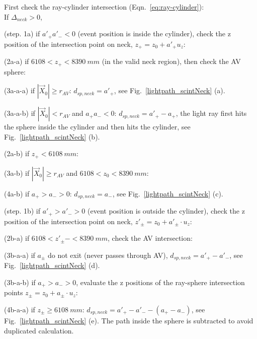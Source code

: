 \begin{algorithm}
	
	First check the ray-cylinder intersection (Eqn.~\ref{eq:ray-cylinder}):\\
	If {$\Delta_{neck}>0$}, 
	
	\hspace{2mm}(step. 1a) if $a'_+a'_-<0$ (event position is inside the cylinder), check the z position of the intersection point on neck, $z_+ = z_0 + a'_+u_z$: 
	
	\hspace{6mm}(2a-a) if $6108<z_+<8390~mm$ (in the valid neck region), then check the AV sphere:
	
	\hspace{8mm}(3a-a-a) if $|\vec{X}_0|\geq r_{AV}$: $d_{sp,neck}=a'_+$, see Fig.~\ref{lightpath_scintNeck} (a).
	
	\hspace{8mm}(3a-a-b) if $|\vec{X}_0|<r_{AV}$ and $a_+a_-<0$: $d_{sp,neck}=a'_+-a_+$, the light ray first hits the sphere inside the cylinder and then hits the cylinder, see Fig.~\ref{lightpath_scintNeck} (b). 
	
	\hspace{6mm}(2a-b) if $z_+<6108~mm$:
	
	\hspace{8mm}(3a-b) if $|\vec X_0|\geq r_{AV}$ and $6108<z_0<8390~mm$:
	
	\hspace{10mm}(4a-b) if $a_+>a_->0$: $d_{sp,neck}=a_-$, see Fig.~\ref{lightpath_scintNeck} (c).
	
	\hspace{2mm}(step. 1b) if $a'_+>a'_->0$ (event position is outside the cylinder), check the z position of the intersection point on neck, $z'_{\pm}=z_0+a'_\pm\cdot u_z$:
	
	\hspace{6mm}(2b-a) if $6108<z'_\pm-<8390~mm$, check the AV intersection:
	
	\hspace{8mm}(3b-a-a) if $a_\pm$ do not exit (never passes through AV), $d_{sp,neck}=a'_+ - a'_-$, see Fig.~\ref{lightpath_scintNeck} (d).
	
	\hspace{8mm}(3b-a-b) if $a_+>a_->0$, evaluate the z positions of the ray-sphere intersection points $z_\pm=z_0+a_\pm\cdot u_z$:
	
	\hspace{10mm}(4b-a-a) if $z_\pm\geq 6108~mm$: $d_{sp,neck}=a'_+ - a'_--(a_+-a_-)$, see Fig.~\ref{lightpath_scintNeck} (e). The path inside the sphere is subtracted to avoid duplicated calculation.
	

\end{algorithm}
